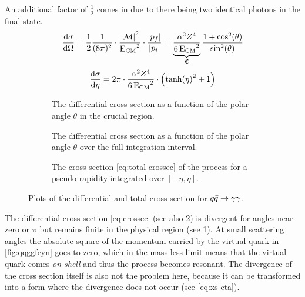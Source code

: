 An additional factor of \(\frac{1}{2}\) comes in due to there being
two identical photons in the final state.
\begin{equation}
  \label{eq:crossec}
  \dv{\sigma}{\Omega} =
  \frac{1}{2}\frac{1}{(8\pi)^2}\cdot\frac{\abs{\mathcal{M}}^2}{\operatorname{E_{\text{CM}}}^2}\cdot\frac{\abs{p_f}}{\abs{p_i}}
  = \underbrace{\frac{\alpha^2Z^4}{6\operatorname{E_{\text{CM}}}^2}}_{\mathfrak{C}}\frac{1+\cos^2(\theta)}{\sin^2(\theta)}
\end{equation}
%
\begin{equation}
  \label{eq:xs-eta}
  \dv{\sigma}{\eta} = 2\pi\cdot\frac{\alpha^2Z^4}{6\operatorname{E_{\text{CM}}}^2}\cdot\qty(\tanh(\eta)^2 + 1)
\end{equation}
%
\begin{figure}[ht]
  \centering
  \begin{subfigure}[t]{.49\textwidth}
    \centering {}

    \caption[Plot of the differential cross section of the \(\qqgg\)
    process.]{\label{fig:diffxs_zoom} The differential cross section as a
      function of the polar angle \(\theta\) in the crucial region.}
  \end{subfigure}
  \begin{subfigure}[t]{.49\textwidth}
    \centering {}
    \caption[Plot of the differential cross section of the \(\qqgg\)
    process.]{\label{fig:diffxs} The differential cross section as a
      function of the polar angle \(\theta\) over the full integration
      interval. }
  \end{subfigure}
  \begin{subfigure}[t]{.49\textwidth}
  \centering
  \caption[Plot of the total cross section of the \(\qqgg\)
  process.]{\label{fig:totxs} The cross section
    \cref{eq:total-crossec} of the process for a pseudo-rapidity
    integrated over \([-\eta, \eta]\).}
\end{subfigure}
\caption{\label{fig:xsfirst} Plots of the differential and total cross section
  for \(\qqgg\).}
\end{figure}
%
The differential cross section \cref{eq:crossec} (see also
\cref{fig:diffxs}) is divergent for angles near zero or \(\pi\) but
remains finite in the physical region (see \cref{fig:diffxs_zoom}). At
small scattering angles the absolute square of the momentum carried by
the virtual quark in \cref{fig:qqggfeyn} goes to zero, which in the
mass-less limit means that the virtual quark comes \emph{on-shell} and
thus the process becomes resonant. The divergence of the cross section
itself is also not the problem here, because it can be transformed
into a form where the divergence does not occur (see
\cref{eq:xs-eta}).

